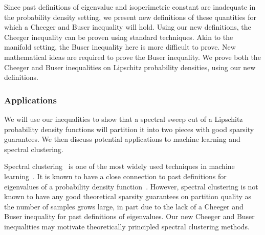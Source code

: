 Since past definitions of eigenvalue and isoperimetric constant are
inadequate in the probability density setting, we present new
definitions of these quantities for which a Cheeger and Buser inequality
will hold. Using our new definitions, the Cheeger inequality can be
proven using standard techniques. Akin to the manifold setting, the
Buser inequality here is more difficult to prove. New mathematical ideas
are required to prove the Buser inequality. We prove both the
Cheeger and Buser inequalities on Lipschitz probability densities, using
our new definitions.

\subsubsection{Applications}
We will use our inequalities to show that a spectral sweep cut of a
Lipschitz
probability density functions will partition it into two pieces with
good sparsity guarantees.  We then discuss potential applications to
machine learning and spectral clustering. 

Spectral clustering~\cite{ShiMalik97,
NgSpectral01} is one of the most widely used techniques in machine
learning~\cite{von2007tutorial}. It is known to have a close connection to
past definitions for eigenvalues of a probability density
function~\cite{TrillosVariational15}. However, spectral clustering is
not known to have any good theoretical sparsity guarantees on partition quality as the number
of samples grows large,
in part due to the lack of a Cheeger and Buser inequality for past
definitions of eigenvalues.  Our new Cheeger and Buser inequalities may
motivate theoretically principled spectral clustering methods.




% 

